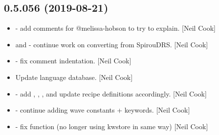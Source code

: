\documentclass[a4paper,10pt,english]{report}
\begin{document}
\subsection{0.5.056 (2019-08-21)}
\label{\detokenize{misc/changelog:id86}}\begin{itemize}
\item {} 
 - add comments for @melissa-hobson to try to
explain. {[}Neil Cook{]}

\item {} 
 and  - continue work on
converting from SpirouDRS. {[}Neil Cook{]}

\item {} 
 - fix comment indentation. {[}Neil Cook{]}

\item {} 
Update language database. {[}Neil Cook{]}

\item {} 
 - add ,
, ,  and update recipe
definitions accordingly. {[}Neil Cook{]}

\item {} 
 - continue adding wave constants + keywords. {[}Neil
Cook{]}

\item {} 
 - fix  function (no longer using
kwstore in same way) {[}Neil Cook{]}

\end{itemize}
\end{document}
